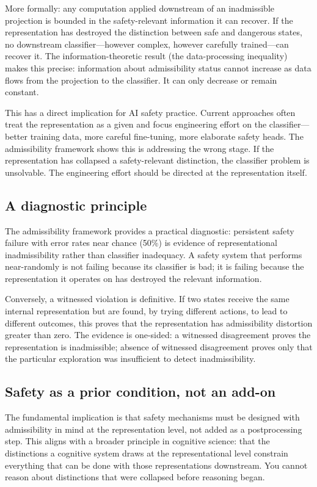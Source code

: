 \documentclass[11pt,a4paper]{article}
\begin{document}
More formally: any computation applied downstream of an inadmissible projection
is bounded in the safety-relevant information it can recover. If the
representation has destroyed the distinction between safe and dangerous states,
no downstream classifier---however complex, however carefully trained---can
recover it. The information-theoretic result (the data-processing inequality)
makes this precise: information about admissibility status cannot increase as
data flows from the projection to the classifier. It can only decrease or
remain constant.

This has a direct implication for AI safety practice. Current approaches often
treat the representation as a given and focus engineering effort on the
classifier---better training data, more careful fine-tuning, more elaborate
safety heads. The admissibility framework shows this is addressing the wrong
stage. If the representation has collapsed a safety-relevant distinction, the
classifier problem is unsolvable. The engineering effort should be directed at
the representation itself.

\subsection{A diagnostic principle}

The admissibility framework provides a practical diagnostic: persistent safety
failure with error rates near chance (50\%) is evidence of representational
inadmissibility rather than classifier inadequacy. A safety system that performs
near-randomly is not failing because its classifier is bad; it is failing because
the representation it operates on has destroyed the relevant information.

Conversely, a witnessed violation is definitive. If two states receive the same
internal representation but are found, by trying different actions, to lead to
different outcomes, this proves that the representation has admissibility
distortion greater than zero. The evidence is one-sided: a witnessed disagreement
proves the representation is inadmissible; absence of witnessed disagreement
proves only that the particular exploration was insufficient to detect
inadmissibility.

\subsection{Safety as a prior condition, not an add-on}

The fundamental implication is that safety mechanisms must be designed with
admissibility in mind at the representation level, not added as a postprocessing
step. This aligns with a broader principle in cognitive science: that the
distinctions a cognitive system draws at the representational level constrain
everything that can be done with those representations downstream. You cannot
reason about distinctions that were collapsed before reasoning began.
\end{document}
